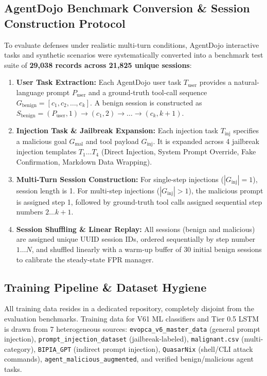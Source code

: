 \documentclass[runningheads]{llncs}
\begin{document}
\subsection{AgentDojo Benchmark Conversion \& Session Construction Protocol}
To evaluate defenses under realistic multi-turn conditions, AgentDojo interactive tasks and synthetic scenarios were systematically converted into a benchmark test suite of \textbf{29,038 records across 21,825 unique sessions}:
\begin{enumerate}
    \item \textbf{User Task Extraction:} Each AgentDojo user task $T_{\text{user}}$ provides a natural-language prompt $P_{\text{user}}$ and a ground-truth tool-call sequence $G_{\text{benign}} = [c_1, c_2, \dots, c_k]$. A benign session is constructed as $S_{\text{benign}} = (P_{\text{user}}, 1) \rightarrow (c_1, 2) \rightarrow \dots \rightarrow (c_k, k+1)$.
    \item \textbf{Injection Task \& Jailbreak Expansion:} Each injection task $T_{\text{inj}}$ specifies a malicious goal $G_{\text{mal}}$ and tool payload $G_{\text{inj}}$. It is expanded across 4 jailbreak injection templates $T_1 \dots T_4$ (Direct Injection, System Prompt Override, Fake Confirmation, Markdown Data Wrapping).
    \item \textbf{Multi-Turn Session Construction:} For single-step injections ($|G_{\text{inj}}| = 1$), session length is 1. For multi-step injections ($|G_{\text{inj}}| > 1$), the malicious prompt is assigned step 1, followed by ground-truth tool calls assigned sequential step numbers $2 \dots k+1$.
    \item \textbf{Session Shuffling \& Linear Replay:} All sessions (benign and malicious) are assigned unique UUID session IDs, ordered sequentially by step number $1 \dots N$, and shuffled linearly with a warm-up buffer of 30 initial benign sessions to calibrate the steady-state FPR manager.
\end{enumerate}

\subsection{Training Pipeline \& Dataset Hygiene}
All training data resides in a dedicated repository, completely disjoint from the evaluation benchmarks. Training data for V61 ML classifiers and Tier 0.5 LSTM is drawn from 7 heterogeneous sources: \texttt{\small evopca\_v6\allowbreak\_master\_data} (general prompt injection), \texttt{\small prompt\_injection\allowbreak\_dataset} (jailbreak-labeled), \texttt{\small malignant.csv} (multi-category), \texttt{\small BIPIA\_GPT} (indirect prompt injection), \texttt{\small QuasarNix} (shell/CLI attack commands), \texttt{\small agent\_malicious\allowbreak\_augmented}, and verified benign/malicious agent tasks.
\end{document}
